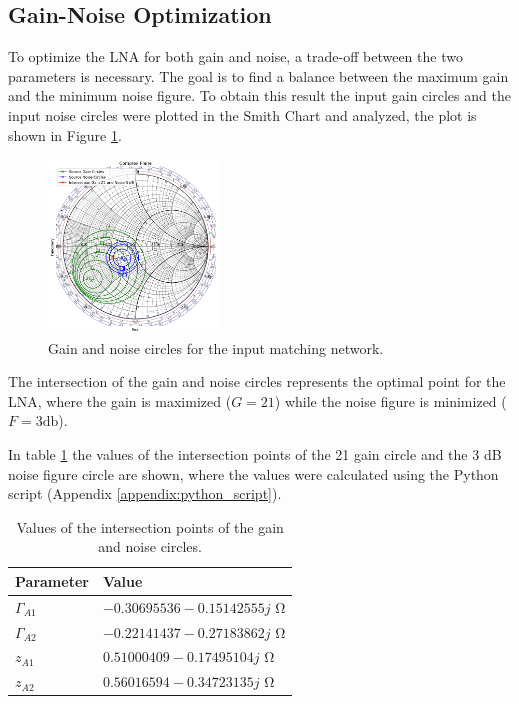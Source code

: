 \subsection{Gain-Noise Optimization}

To optimize the LNA for both gain and noise, a trade-off between the two parameters is necessary. The goal is to find a balance between the maximum gain and the minimum noise figure. To obtain this result the input gain circles and the input noise circles were plotted in the Smith Chart and analyzed, the plot is shown in Figure \ref{fig:GainNoiseOptimization}. 

\begin{figure}[H]
    \centering
    \includegraphics[width=0.4\textwidth]{Images/GainNoiseOptimization.png}
    \caption{Gain and noise circles for the input matching network.}
    \label{fig:GainNoiseOptimization}
\end{figure}
The intersection of the gain and noise circles represents the optimal point for the LNA, where the gain is maximized ($G = 21$) while the noise figure is minimized ($F = 3 \si{\decibel}$).

In table \ref{tab:GainNoiseOptimization} the values of the intersection points of the 21 gain circle and the 3 dB noise figure circle are shown, where the values were calculated using the Python script (Appendix \ref{appendix:python_script}).

\begin{table}[H]
    \centering
    \caption{Values of the intersection points of the gain and noise circles.}
    \begin{tabularx}{\textwidth}{>{\centering\arraybackslash}X >{\centering\arraybackslash}X}
        \toprule
        \textbf{Parameter} & \textbf{Value} \\
        \midrule
        $\Gamma_{A1}$     & $-0.30695536-0.15142555j$ \si{\ohm} \\
        \midrule
        $\Gamma_{A2}$     & $-0.22141437-0.27183862j$ \si{\ohm} \\
        \midrule
        $z_{A1}$     & $0.51000409-0.17495104j$ \si{\ohm} \\
        \midrule
        $z_{A2}$     & $0.56016594-0.34723135j$ \si{\ohm}\\
        \bottomrule
    \end{tabularx}
    \label{tab:GainNoiseOptimization}
\end{table}

